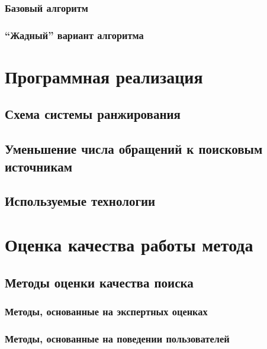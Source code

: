 \documentclass[12pt,a4paper]{report}
\begin{document}
\subsection{Базовый алгоритм}
\subsection{``Жадный'' вариант алгоритма}


\chapter{Программная реализация}

\section{Схема системы ранжирования}
\section{Уменьшение числа обращений к поисковым источникам}
\section{Используемые технологии}

\chapter{Оценка качества работы метода}

\section{Методы оценки качества поиска}
\subsection{Методы, основанные на экспертных оценках}
\subsection{Методы, основанные на поведении пользователей}
\end{document}
